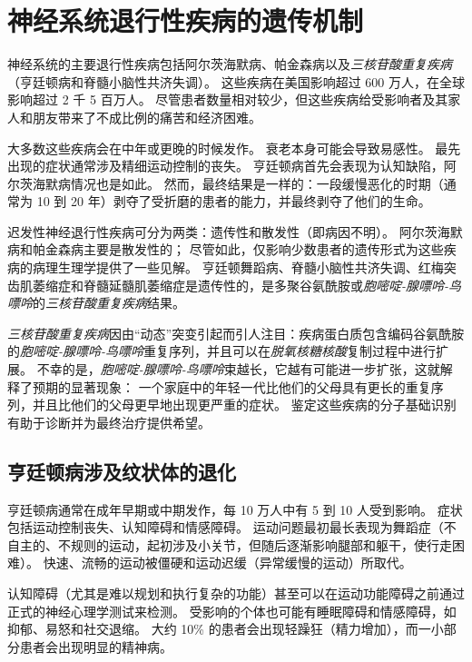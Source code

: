 \chapter{神经系统退行性疾病的遗传机制} \label{chap:chap63}

神经系统的主要退行性疾病包括阿尔茨海默病、帕金森病以及\textit{三核苷酸重复疾病}（亨廷顿病和脊髓小脑性共济失调）。
这些疾病在美国影响超过 600 万人，在全球影响超过 2 千 5 百万人。
尽管患者数量相对较少，但这些疾病给受影响者及其家人和朋友带来了不成比例的痛苦和经济困难。


大多数这些疾病会在中年或更晚的时候发作。
衰老本身可能会导致易感性。
最先出现的症状通常涉及精细运动控制的丧失。
亨廷顿病首先会表现为认知缺陷，阿尔茨海默病情况也是如此。
然而，最终结果是一样的：一段缓慢恶化的时期（通常为 10 到 20 年）剥夺了受折磨的患者的能力，并最终剥夺了他们的生命。


迟发性神经退行性疾病可分为两类：遗传性和散发性（即病因不明）。
阿尔茨海默病和帕金森病主要是散发性的；
尽管如此，仅影响少数患者的遗传形式为这些疾病的病理生理学提供了一些见解。
亨廷顿舞蹈病、脊髓小脑性共济失调、红梅突齿肌萎缩症和脊髓延髓肌萎缩症是遗传性的，是多聚谷氨酰胺或\textit{胞嘧啶-腺嘌呤-鸟嘌呤}的\textit{三核苷酸重复疾病}结果。


\textit{三核苷酸重复疾病}因由“动态”突变引起而引人注目：疾病蛋白质包含编码谷氨酰胺的\textit{胞嘧啶-腺嘌呤-鸟嘌呤}重复序列，并且可以在\textit{脱氧核糖核酸}复制过程中进行扩展。
不幸的是，\textit{胞嘧啶-腺嘌呤-鸟嘌呤}束越长，它越有可能进一步扩张，这就解释了预期的显著现象：
一个家庭中的年轻一代比他们的父母具有更长的重复序列，并且比他们的父母更早地出现更严重的症状。
鉴定这些疾病的分子基础识别有助于诊断并为最终治疗提供希望。



\section{亨廷顿病涉及纹状体的退化}

亨廷顿病通常在成年早期或中期发作，每 10 万人中有 5 到 10 人受到影响。
症状包括运动控制丧失、认知障碍和情感障碍。
运动问题最初最长表现为舞蹈症（不自主的、不规则的运动，起初涉及小关节，但随后逐渐影响腿部和躯干，使行走困难）。
快速、流畅的运动被僵硬和运动迟缓（异常缓慢的运动）所取代。


认知障碍（尤其是难以规划和执行复杂的功能）甚至可以在运动功能障碍之前通过正式的神经心理学测试来检测。
受影响的个体也可能有睡眠障碍和情感障碍，如抑郁、易怒和社交退缩。
大约 10\% 的患者会出现轻躁狂（精力增加），而一小部分患者会出现明显的精神病。


